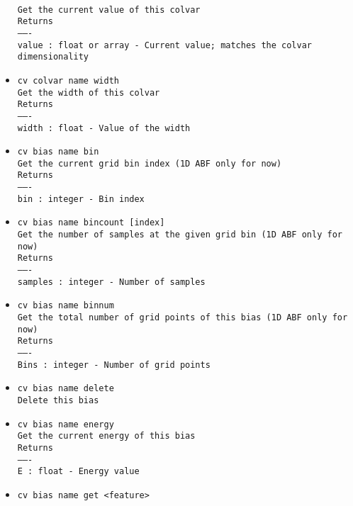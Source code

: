 \begin{itemize}
\\
\texttt{Get the current value of this colvar}
\\
\texttt{Returns}
\\
\texttt{-------}
\\
\texttt{value : float or array - Current value; matches the colvar dimensionality}
\item \texttt{cv colvar name width}
\\
\texttt{Get the width of this colvar}
\\
\texttt{Returns}
\\
\texttt{-------}
\\
\texttt{width : float - Value of the width}
\end{itemize}
\begin{itemize}
\item \texttt{cv bias name bin}
\\
\texttt{Get the current grid bin index (1D ABF only for now)}
\\
\texttt{Returns}
\\
\texttt{-------}
\\
\texttt{bin : integer - Bin index}
\item \texttt{cv bias name bincount [index]}
\\
\texttt{Get the number of samples at the given grid bin (1D ABF only for now)}
\\
\texttt{Returns}
\\
\texttt{-------}
\\
\texttt{samples : integer - Number of samples}
\item \texttt{cv bias name binnum}
\\
\texttt{Get the total number of grid points of this bias (1D ABF only for now)}
\\
\texttt{Returns}
\\
\texttt{-------}
\\
\texttt{Bins : integer - Number of grid points}
\item \texttt{cv bias name delete}
\\
\texttt{Delete this bias}
\item \texttt{cv bias name energy}
\\
\texttt{Get the current energy of this bias}
\\
\texttt{Returns}
\\
\texttt{-------}
\\
\texttt{E : float - Energy value}
\item \texttt{cv bias name get <feature>}

\end{itemize}
